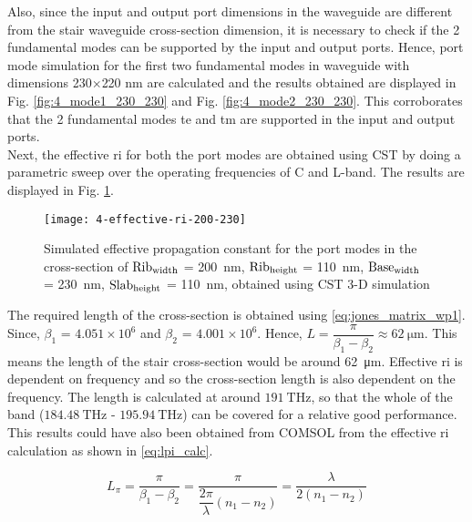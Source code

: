 \documentclass[../report.tex]{subfiles}
\begin{document}
\noindent Also, since the input and output port dimensions in the waveguide are different from the stair waveguide cross-section dimension, it is necessary to check if the 2 fundamental modes can be supported by the input and output ports. Hence, port mode simulation for the first two fundamental modes in waveguide with dimensions 230$\times$220 nm are calculated and the results obtained are displayed in Fig. \ref{fig:4_mode1_230_230} and Fig. \ref{fig:4_mode2_230_230}. This corroborates that the 2 fundamental modes \gls{te} and \gls{tm} are supported in the input and output ports.\\

\noindent Next, the effective \gls{ri} for both the port modes are obtained using CST by doing a parametric sweep over the operating frequencies of C and L-band. The results are displayed in Fig. \ref{fig:4_effective_ri_200_230}. 

\begin{figure}[H] %
	\centering
	\texttt{[image: 4-effective-ri-200-230]}
	\caption{Simulated effective propagation constant for the port modes in the cross-section of $\mathrm{Rib_{width}}$ = \SI{200}{\nano \meter}, $\mathrm{Rib_{height}}$ = \SI{110}{\nano \meter}, $\mathrm{Base_{width}}$ = \SI{230}{\nano \meter}, $\mathrm{Slab_{height}}$ = \SI{110}{\nano \meter}, obtained using CST 3-D simulation}
	\label{fig:4_effective_ri_200_230}
\end{figure}

\noindent The required length of the cross-section is obtained using \ref{eq:jones_matrix_wp1}. Since, $\beta_1$ = $4.051 \times 10^6$  and $\beta_2$ = $4.001 \times 10^6$. Hence, $L = \dfrac{\pi}{\beta_1 - \beta_2} \approx \SI{62}{\micro \meter}$. This means the length of the stair cross-section would be around \SI{62}{\micro \meter}. Effective \gls{ri} is dependent on frequency and so the cross-section length is also dependent on the frequency. The length is calculated at around $\SI{191}{\THz}$, so that the whole of the band ($\SI{184.48}{\THz}$ - $\SI{195.94}{\THz}$) can be covered for a relative good performance. This results could have also been obtained from COMSOL from the effective \gls{ri} calculation as shown in \ref{eq:lpi_calc}.

\begin{equation}\label{eq:lpi_calc}
L_\pi =  \dfrac {\pi} {\beta_1 - \beta_2} = \dfrac {\pi} {\dfrac {2\pi} {\lambda}\left(n_1 - n_2\right)} = \dfrac {\lambda} {2(n_1 - n_2)}
\end{equation}
\end{document}
